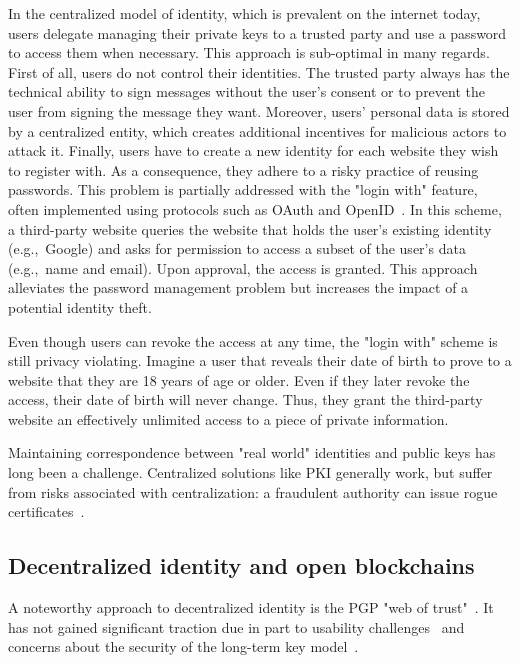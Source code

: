 In the centralized model of identity, which is prevalent on the internet today, users delegate managing their private keys to a trusted party and use a password to access them when necessary.
This approach is sub-optimal in many regards.
First of all, users do not control their identities.
The trusted party always has the technical ability to sign messages without the user's consent or to prevent the user from signing the message they want.
Moreover, users' personal data is stored by a centralized entity, which creates additional incentives for malicious actors to attack it.
Finally, users have to create a new identity for each website they wish to register with.
As a consequence, they adhere to a risky practice of reusing passwords.
This problem is partially addressed with the "login with" feature, often implemented using protocols such as OAuth and OpenID~\cite{Dodanduwa2018}.
In this scheme, a third-party website queries the website that holds the user's existing identity (e.g.,~Google) and asks for permission to access a subset of the user's data (e.g.,~name and email).
Upon approval, the access is granted.
This approach alleviates the password management problem but increases the impact of a potential identity theft.

Even though users can revoke the access at any time, the "login with" scheme is still privacy violating.
Imagine a user that reveals their date of birth to prove to a website that they are 18 years of age or older.
Even if they later revoke the access, their date of birth will never change.
Thus, they grant the third-party website an effectively unlimited access to a piece of private information.

Maintaining correspondence between "real world" identities and public keys has long been a challenge.
Centralized solutions like PKI generally work, but suffer from risks associated with centralization: a fraudulent authority can issue rogue certificates~\cite{Amann2017}.


\subsection{Decentralized identity and open blockchains}

A noteworthy approach to decentralized identity is the PGP "web of trust"~\cite{Feisthammel2017}.
It has not gained significant traction due in part to usability challenges~\cite{Ruoti2015} and concerns about the security of the long-term key model~\cite{Valsorda2016}.

